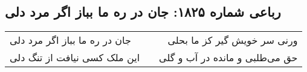 \begin{center}
\section*{رباعی شماره ۱۸۲۵: جان در ره ما بباز اگر مرد دلی}
\label{sec:1825}
\begin{longtable}{l p{0.5cm} r}
جان در ره ما بباز اگر مرد دلی
&&
ورنی سر خویش گیر کز ما بحلی
\\
این ملک کسی نیافت از تنگ دلی
&&
حق می‌طلبی و مانده در آب و گلی
\\
\end{longtable}
\end{center}
